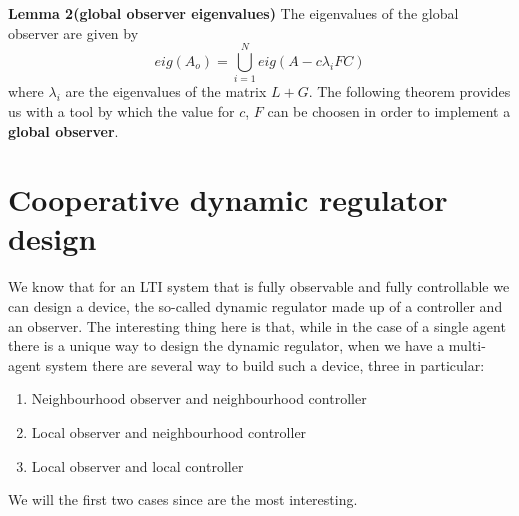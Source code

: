 \noindent
\textbf{Lemma 2(global observer eigenvalues)} The eigenvalues of the global observer are given by
\begin{equation*}
    eig(A_o) = \bigcup_{i=1}^N eig(A-c\lambda_i FC) 
\end{equation*}
where $\lambda_i$ are the eigenvalues of the matrix $L+G$.
The following theorem provides us with a tool by which the value for $c$, $F$ can be choosen in order to implement a \textbf{global observer}.\\

\hspace*{-5mm}
%

\section{Cooperative dynamic regulator design}
\noindent
We know that for an LTI system that is fully observable and fully controllable we can design a device, the so-called dynamic regulator made up of a controller and an observer. The interesting thing here is that, while in the case of a single agent there is a unique way to design the dynamic regulator, when we have a multi-agent system there are several way to build such a device, three in particular:
\begin{enumerate}
    \item Neighbourhood observer and neighbourhood controller
    \item Local observer and neighbourhood controller
    \item Local observer and local controller
\end{enumerate}
We will the first two cases since are the most interesting.

